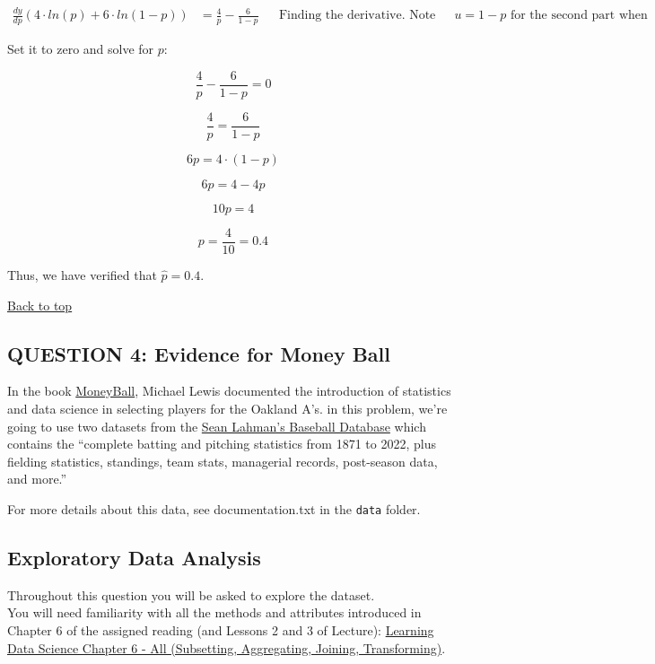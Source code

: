 \documentclass[11pt]{article}
\begin{document}
\[
\begin{align*}
    \frac{dy}{dp}(4\cdot ln(p) + 6\cdot ln(1-p))  &=  \frac{4}{p} - \frac{6}{1-p} && \text{Finding the derivative. Note that we used $u = 1 - p$ for the second part when deriving} 
\end{align*}
\]

Set it to zero and solve for \(p\):

\[
\frac{4}{p} - \frac{6}{1-p} = 0
\]

\[
\frac{4}{p} = \frac{6}{1-p}
\]

\[
6p = 4 \cdot (1- p)
\]

\[
6p = 4 - 4p
\]

\[
10p = 4
\]

\[
p = \frac{4}{10} = 0.4
\]

Thus, we have verified that \(\hat{p} = 0.4\).

    \hyperref[top]{Back to top}

\subsection{\texorpdfstring{ QUESTION 4: Evidence for Money
Ball}{ QUESTION 4: Evidence for Money Ball}}\label{question-4-evidence-for-money-ball}

In the book \href{https://en.wikipedia.org/wiki/Moneyball}{MoneyBall},
Michael Lewis documented the introduction of statistics and data science
in selecting players for the Oakland A's. in this problem, we're going
to use two datasets from the \href{http://seanlahman.com/}{Sean Lahman's
Baseball Database} which contains the ``complete batting and pitching
statistics from 1871 to 2022, plus fielding statistics, standings, team
stats, managerial records, post-season data, and more.''

For more details about this data, see documentation.txt in the
\texttt{data} folder.

    \subsection{Exploratory Data Analysis}\label{exploratory-data-analysis}

Throughout this question you will be asked to explore the dataset.\\
You will need familiarity with all the methods and attributes introduced
in Chapter 6 of the assigned reading (and Lessons 2 and 3 of Lecture):
\href{https://learningds.org/ch/06/pandas_intro.html}{Learning Data
Science Chapter 6 - All (Subsetting, Aggregating, Joining,
Transforming)}.
\end{document}
